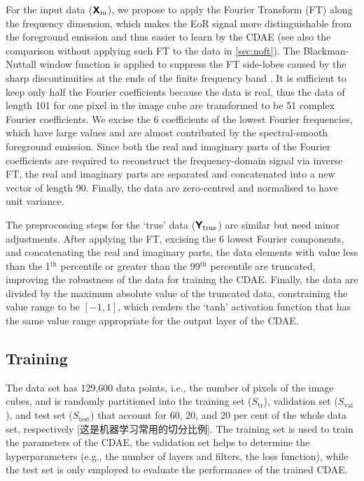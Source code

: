 \documentclass[letters,a4paper,fleqn,usenatbib]{mnras}
\newcommand{\R}[1]{\mathrm{#1}}
\newcommand{\M}[1]{\mathbfss{#1}}
\begin{document}
For the input data ($\M{X}_{\R{in}}$), we propose to apply the Fourier
Transform (FT) along the frequency dimension, which makes the EoR
signal more distinguishable from the foreground emission and thus
easier to learn by the CDAE (see also the comparison without applying
such FT to the data in \autoref{sec:noft}).
The Blackman-Nuttall window function is applied to suppress the
FT side-lobes caused by the sharp discontinuities at the ends
of the finite frequency band \citep[e.g.,][]{chapman2016}.
It is sufficient to keep only half the Fourier coefficients because
the data is real, thus the data of length 101 for one pixel in the
image cube are transformed to be 51 complex Fourier coefficients.
We excise the 6 coefficients of the lowest Fourier frequencies, which
have large values and are almost contributed by the spectral-smooth
foreground emission.
Since both the real and imaginary parts of the Fourier coefficients
are required to reconstruct the frequency-domain signal via inverse FT,
the real and imaginary parts are separated and concatenated into a new
vector of length 90.
Finally, the data are zero-centred and normalised to have unit variance.

The preprocessing steps for the `true' data ($\M{Y}_{\R{true}}$) are
similar but need minor adjustments.
After applying the FT, excising the 6 lowest Fourier components, and
concatenating the real and imaginary parts,
the data elements with value less than the 1$^{\R{th}}$ percentile or
greater than the 99$^{\R{th}}$ percentile are truncated, improving the
robustness of the data for training the CDAE.
Finally, the data are divided by the maximum absolute value of the
truncated data, constraining the value range to be $[-1, 1]$,
which renders the `tanh' activation function that has the same value
range appropriate for the output layer of the CDAE.


\subsection{Training}
\label{sec:training}

The data set has 129,600 data points, i.e., the number of pixels of
the image cubes, and is randomly partitioned into the
training set ($S_{\R{tr}}$), validation set ($S_{\R{val}}$), and
test set ($S_{\R{test}}$) that account for 60, 20, and 20 per cent of
the whole data set, respectively [这是机器学习常用的切分比例].
The training set is used to train the parameters of the CDAE,
the validation set helps to determine the hyperparameters (e.g., the
number of layers and filters, the loss function),
while the test set is only employed to evaluate the performance of the
trained CDAE.
\end{document}
